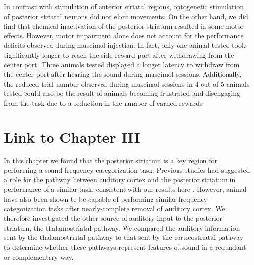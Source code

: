 In contrast with stimulation of anterior striatal regions, optogenetic stimulation of posterior striatal neurons did not elicit movements. 
%
On the other hand, we did find that chemical inactivation of the posterior striatum resulted in some motor effects.
%
However, motor impairment alone does not account for the performance deficits
observed during muscimol injection.
%
In fact, only one animal tested took significantly longer to reach the side
reward port after withdrawing from the center port.
%
Three animals tested displayed a longer latency to withdraw from the center port
after hearing the sound during muscimol sessions. 
%
Additionally, the reduced trial number observed during muscimol sessions in 4 out of 5 animals tested could also be the result of animals becoming frustrated and disengaging from the task due to a reduction in the number of earned rewards.

\section{Link to Chapter III}

In this chapter we found that the posterior striatum is a key region for performing a sound frequency-categorization task.
%
Previous studies had suggested a role for the pathway between auditory cortex and the posterior striatum in performance of a similar task, consistent with our results here \citep{Znamenskiy2013, Xiong2015}.
%
However, animal have also been shown to be capable of performing similar frequency-categorization tasks after nearly-complete removal of auditory cortex.
%
We therefore investigated the other source of auditory input to the posterior striatum, the thalamostriatal pathway. 
%
We compared the auditory information sent by the thalamostriatal pathway to that sent by the corticostriatal pathway to determine whether these pathways represent features of sound in a redundant or complementary way. 


